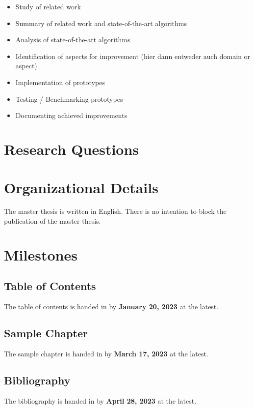 \documentclass[english,notitlepage,smartquotes]{hgbreport}
\begin{document}
\begin{itemize}
	\item Study of related work
	\item Summary of related work and state-of-the-art algorithms
	\item Analysis of state-of-the-art algorithms
	\item Identification of aspects for improvement (hier dann entweder auch domain or aspect)
	\item Implementation of prototypes
	\item Testing / Benchmarking prototypes
	\item Documenting achieved improvements
\end{itemize}

\section{Research Questions}


\section{Organizational Details}

The master thesis is written in English.
There is no intention to block the publication of the master thesis.

\section{Milestones}

\subsection{Table of Contents}

The table of contents is handed in by \textbf{January 20, 2023} at the latest.

\subsection{Sample Chapter}

The sample chapter is handed in by \textbf{March 17, 2023} at the latest.

\subsection{Bibliography}

The bibliography is handed in by \textbf{April 28, 2023} at the latest.
\end{document}
